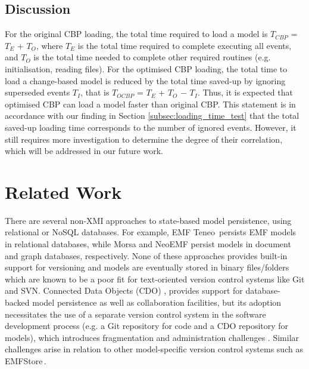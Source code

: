 \documentclass{llncs}
\begin{document}
    \vspace{-15pt}
     \subsection{Discussion}
    \label{sec:discussion}
    
    \vspace{-10pt}
    For the original CBP loading, the total time required to load a model is $T_{CBP}$ = $T_E$ + $T_O$, where $T_E$ is the total time required to complete executing all events, and $T_O$ is the total time needed to complete other required routines (e.g. initialisation, reading files). For the optimised CBP loading, the total time to load a change-based model is reduced by the total time saved-up by ignoring superseded events $T_I$, that is $T_{OCBP}$ = $T_E$ + $T_O$ $-$ $T_I$. Thus, it is expected that optimised CBP can load a model faster than original CBP. This statement is in accordance with our finding in Section \ref{subsec:loading_time_test} that the total saved-up loading time corresponds to the number of ignored events. However, it still requires more investigation to determine the degree of their correlation, which will be addressed in our future work.
    
    \vspace{-5pt}
    \section{Related Work}
    \label{sec:related_work}
    
    \vspace{-10pt}    
    There are several non-XMI approaches to  state-based model persistence, using relational or NoSQL databases. For example, EMF Teneo\,\cite{eclipse2017teneo} persists EMF models in relational databases, while Morsa \cite{pagan2011morsa} and NeoEMF \cite{daniel2016neoemf} persist models in document and graph databases, respectively.  None of these approaches provides built-in support for versioning and models are eventually stored in binary files/folders which are known to be a poor fit for text-oriented version control systems like Git and SVN. Connected Data Objects (CDO) \cite{eclipse2017cdo}, provides support for database-backed model persistence as well as collaboration facilities, but its adoption necessitates the use of a separate version control system in the software development process (e.g. a Git repository for code and a CDO repository for models), which introduces fragmentation and administration challenges \cite{barmpis2014evaluation}. Similar challenges arise in relation to other model-specific version control systems such as EMFStore\,\cite{koegel2010emfstore}.
    
\end{document}
